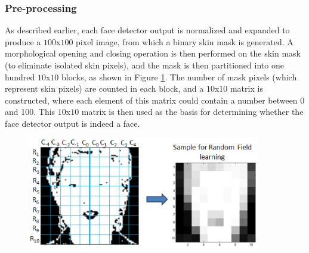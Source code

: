 \documentclass[times, 10pt,twocolumn]{article}
\begin{document}
\subsubsection{Pre-processing}\label{Preprocessing}As described earlier,
each face detector output is normalized and expanded to produce a
$100$x$100$ pixel image, from which a binary skin mask is generated.
A morphological opening and closing operation is then performed on
the skin mask (to eliminate isolated skin pixels), and the mask is
then partitioned into one hundred $10$x$10$ blocks, as shown in
Figure \ref{Fig:RowColumnBlocks}. The number of mask pixels (which
represent skin pixels) are counted in each block, and a $10$x$10$
matrix is constructed, where each element of this matrix could
contain a number between 0 and 100. This $10$x$10$ matrix is then
used as the basis for determining whether the face detector output
is indeed a face.

\begin{figure}[h]
\hspace{-0.3in}
\includegraphics[width=4in]{Figure7.eps} \caption{{\bf
{\selectfont }}} \label{Fig:RowColumnBlocks}
\end{figure}
\end{document}
